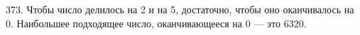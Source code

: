 373. Чтобы число делилось на 2 и на 5, достаточно, чтобы оно оканчивалось на 0. Наибольшее подходящее число, оканчивающееся на 0 --- это 6320.\\
